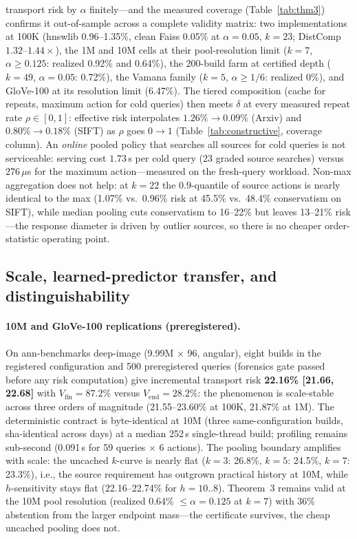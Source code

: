 \documentclass{article}
\begin{document}
transport risk by $\alpha$ finitely---and the measured coverage (Table~\ref{tab:thm3}) confirms it
out-of-sample across a complete validity matrix: two implementations at 100K (hnswlib 0.96--1.35\%,
clean Faiss 0.05\% at $\alpha{=}0.05$, $k{=}23$; DistComp $1.32$--$1.44\times$), the 1M and 10M cells
at their pool-resolution limit ($k{=}7$, $\alpha{\ge}0.125$: realized 0.92\% and 0.64\%), the
200-build farm at certified depth ($k{=}49$, $\alpha{=}0.05$: 0.72\%), the Vamana family
($k{=}5$, $\alpha{\ge}1/6$: realized 0\%), and GloVe-100 at its resolution limit (6.47\%). The tiered composition (cache for repeats, maximum action for cold
queries) then meets $\delta$ at every measured repeat rate $\rho\in[0,1]$: effective risk interpolates
$1.26\%\to0.09\%$ (Arxiv) and $0.80\%\to0.18\%$ (SIFT) as $\rho$ goes $0\to1$ (Table~\ref{tab:constructive},
coverage column). An \emph{online} pooled policy that searches all sources for cold queries is not
serviceable: serving cost $1.73$\,s per cold query (23 graded source searches) versus $276\,\mu$s for the
maximum action---measured on the fresh-query workload. Non-max aggregation does not help: at $k{=}22$ the $0.9$-quantile of source
actions is nearly identical to the max (1.07\% vs.\ 0.96\% risk at 45.5\% vs.\ 48.4\% conservatism on
SIFT), while median pooling cuts conservatism to 16--22\% but leaves 13--21\% risk---the response
diameter is driven by outlier sources, so there is no cheaper order-statistic operating point.

\subsection{Scale, learned-predictor transfer, and distinguishability}
\label{sec:scale}

\paragraph{10M and GloVe-100 replications (preregistered).}
On ann-benchmarks deep-image (9.99M $\times$ 96, angular), eight builds in the registered
configuration and 500 preregistered queries (forensics gate passed before any risk
computation) give incremental transport risk \textbf{22.16\% [21.66, 22.68]} with
$V_{\mathrm{fin}}{=}87.2\%$ versus $V_{\mathrm{end}}{=}28.2\%$: the phenomenon is
scale-stable across three orders of magnitude (21.55--23.60\% at 100K, 21.87\% at 1M).
The deterministic contract is byte-identical at 10M (three same-configuration builds,
sha-identical across days) at a median 252\,s single-thread build; profiling remains
sub-second (0.091\,s for 59 queries $\times$ 6 actions). The pooling boundary amplifies
with scale: the uncached $k$-curve is nearly flat ($k{=}3$: 26.8\%, $k{=}5$: 24.5\%, $k{=}7$:
23.3\%), i.e., the source requirement has outgrown practical history at 10M, while
$h$-sensitivity stays flat (22.16--22.74\% for $h{=}10{..}8$). Theorem~3 remains valid at the 10M
pool resolution (realized 0.64\% $\le\alpha{=}0.125$ at $k{=}7$) with 36\% abstention from the
larger endpoint mass---the certificate survives, the cheap uncached pooling does not.
\end{document}
